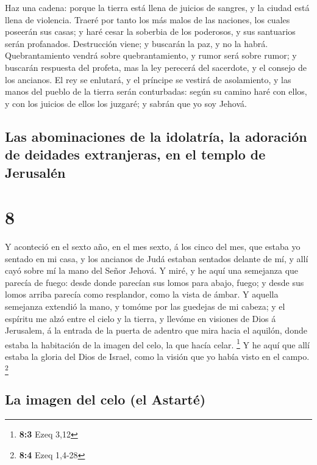  Haz una cadena: porque la tierra está llena de juicios
de sangres, y la ciudad está llena de violencia.  Traeré
por tanto los más malos de las naciones, los cuales poseerán sus casas;
y haré cesar la soberbia de los poderosos, y sus santuarios serán
profanados.  Destrucción viene; y buscarán la paz, y no
la habrá.  Quebrantamiento vendrá sobre quebrantamiento,
y rumor será sobre rumor; y buscarán respuesta del profeta, mas la ley
perecerá del sacerdote, y el consejo de los ancianos.  El
rey se enlutará, y el príncipe se vestirá de asolamiento, y las manos
del pueblo de la tierra serán conturbadas: según su camino haré con
ellos, y con los juicios de ellos los juzgaré; y sabrán que yo soy
Jehová.

\hypertarget{las-abominaciones-de-la-idolatruxeda-la-adoraciuxf3n-de-deidades-extranjeras-en-el-templo-de-jerusaluxe9n}{%
\subsection{Las abominaciones de la idolatría, la adoración de deidades
extranjeras, en el templo de
Jerusalén}\label{las-abominaciones-de-la-idolatruxeda-la-adoraciuxf3n-de-deidades-extranjeras-en-el-templo-de-jerusaluxe9n}}

\hypertarget{section-7}{%
\section{8}\label{section-7}}

 Y aconteció en el sexto año, en el mes sexto, á los cinco
del mes, que estaba yo sentado en mi casa, y los ancianos de Judá
estaban sentados delante de mí, y allí cayó sobre mí la mano del Señor
Jehová.  Y miré, y he aquí una semejanza que parecía de
fuego: desde donde parecían sus lomos para abajo, fuego; y desde sus
lomos arriba parecía como resplandor, como la vista de ámbar.
 Y aquella semejanza extendió la mano, y tomóme por las
guedejas de mi cabeza; y el espíritu me alzó entre el cielo y la tierra,
y llevóme en visiones de Dios á Jerusalem, á la entrada de la puerta de
adentro que mira hacia el aquilón, donde estaba la habitación de la
imagen del celo, la que hacía celar. \footnote{\textbf{8:3} Ezeq 3,12}
 Y he aquí que allí estaba la gloria del Dios de Israel,
como la visión que yo había visto en el campo. \footnote{\textbf{8:4}
  Ezeq 1,4-28}

\hypertarget{la-imagen-del-celo-el-astartuxe9}{%
\subsection{La imagen del celo (el
Astarté)}\label{la-imagen-del-celo-el-astartuxe9}}

